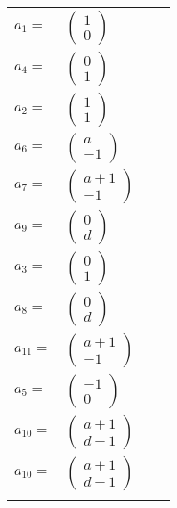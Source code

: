 \documentclass[1p]{elsarticle_modified}
\theoremstyle{definition}
\begin{document}
\begin{tabular}{m{7pt} m{180pt} m{7pt} m{180pt} }
\flushright $a_{1}=$&$\begin{pmatrix}1\\0\end{pmatrix}$ \\
\flushright $a_{4}=$&$\begin{pmatrix}0\\1\end{pmatrix}$ \\
\flushright $a_{2}=$&$\begin{pmatrix}1\\1\end{pmatrix}$ \\
\flushright $a_{6}=$&$\begin{pmatrix}a\\-1\end{pmatrix}$ \\
\flushright $a_{7}=$&$\begin{pmatrix}a+1\\-1\end{pmatrix}$ \\
\flushright $a_{9}=$&$\begin{pmatrix}0\\d\end{pmatrix}$ \\
\flushright $a_{3}=$&$\begin{pmatrix}0\\1\end{pmatrix}$ \\
\flushright $a_{8}=$&$\begin{pmatrix}0\\d\end{pmatrix}$ \\
\flushright $a_{11}=$&$\begin{pmatrix}a+1\\-1\end{pmatrix}$ \\
\flushright $a_{5}=$&$\begin{pmatrix}-1\\0\end{pmatrix}$ \\
\flushright $a_{10}=$&$\begin{pmatrix}a+1\\d-1\end{pmatrix}$\\ \flushright $a_{10}=$&$\begin{pmatrix}a+1\\d-1\end{pmatrix}$\\&\end{tabular}
\end{document}
